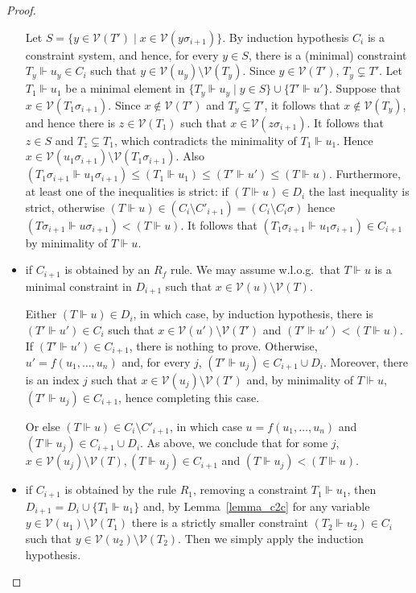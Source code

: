 \documentclass[acmtocl,acmnow]{acmtrans2m}
\newcommand{\var}{\mathcal{V}}
\begin{document}
\begin{proof}
\begin{itemize}
Let $S = \{y\in \var(T')\mid x\in \var(y\sigma_{i+1})\}$. By induction
hypothesis $C_i$ is a constraint system, and hence, for every $y\in
S$, there is a (minimal) constraint $T_y\Vdash u_y\in C_i$ such that
$y\in \var(u_y)\setminus \var(T_y)$. Since $y\in \var(T')$,
$T_y\subsetneq T'$.  Let $T_1\Vdash u_1$ be a minimal element in
$\{T_y\Vdash u_y\mid y\in S\}\cup \{T'\Vdash u'\}$. 
Suppose that $x\in\var(T_1\sigma_{i+1})$.  Since $x\notin\var(T')$ and
$T_y\subsetneq T'$, it follows that $x\notin \var(T_y)$, and hence
there is $z\in\var(T_1)$ such that $x\in\var(z\sigma_{i+1})$. It
follows that $z\in S$ and $T_z\subsetneq T_1$, which contradicts the
minimality of $T_1\Vdash u_1$. Hence $x\in
\var(u_1\sigma_{i+1})\setminus \var(T_1\sigma_{i+1})$.
Also $(T_1\sigma_{i+1}\Vdash u_1\sigma_{i+1}) \leq (T_1\Vdash u_1) \leq
(T'\Vdash u') \leq (T\Vdash u)$. Furthermore, at least one of the
inequalities is strict: if $(T\Vdash u)\in D_i$ the last inequality is
strict, otherwise $(T\Vdash u)\in (C_i\setminus C'_{i+1}) = (C_i\setminus C_i\sigma)$ hence
$(T\sigma_{i+1} \Vdash u\sigma_{i+1}) < (T\Vdash u)$.  It follows that
$(T_1\sigma_{i+1}\Vdash u_1\sigma_{i+1})\in C_{i+1}$ by minimality of
$T\Vdash u$.













\item if $C_{i+1}$ is obtained by an $R_f$ rule. 
We may assume w.l.o.g.~that $T\Vdash u$ is a minimal constraint in $D_{i+1}$ such that $x\in \var(u)\setminus \var(T)$. 

Either $(T\Vdash u)\in D_i$,
in which case, by induction hypothesis, there is $(T'\Vdash u')\in C_i$ such
that $x\in \var(u')\setminus \var(T')$ and $(T'\Vdash u') < (T\Vdash u)$. 
If $(T'\Vdash u')\in C_{i+1}$, there
is nothing to prove. Otherwise, $u'=f(u_1,\ldots,u_n)$ and, for every $j$,
$(T'\Vdash u_j)\in C_{i+1}\cup D_i$. 
Moreover, there is an index $j$ such that
$x\in \var(u_j)\setminus \var(T')$ and, by minimality of $T\Vdash u$, $(T'\Vdash u_j)\in C_{i+1}$, hence completing this case.

Or else $(T\Vdash u) \in C_i\setminus C'_{i+1}$, in which case $u=f(u_1,\ldots,u_n)$ and $(T\Vdash u_j)\in C_{i+1}\cup D_i$. As above, we conclude that for some
$j$, $x\in\var(u_j)\setminus\var(T), (T\Vdash u_j)\in C_{i+1}$ and $(T\Vdash u_j) < (T\Vdash u)$.

\item if $C_{i+1}$ is obtained by the rule $R_1$, removing a constraint $T_1\Vdash u_1$, then $D_{i+1}=D_i\cup\{T_1\Vdash u_1\}$ and, by Lemma~\ref{lemma_c2c} for any variable $y\in \var(u_1)\setminus\var(T_1)$ there is a strictly smaller constraint $(T_2\Vdash u_2)\in C_i$ such that
$y\in\var(u_2)\setminus\var(T_2)$. Then we simply apply the induction hypothesis.
\end{itemize}
\end{proof}
\end{document}
